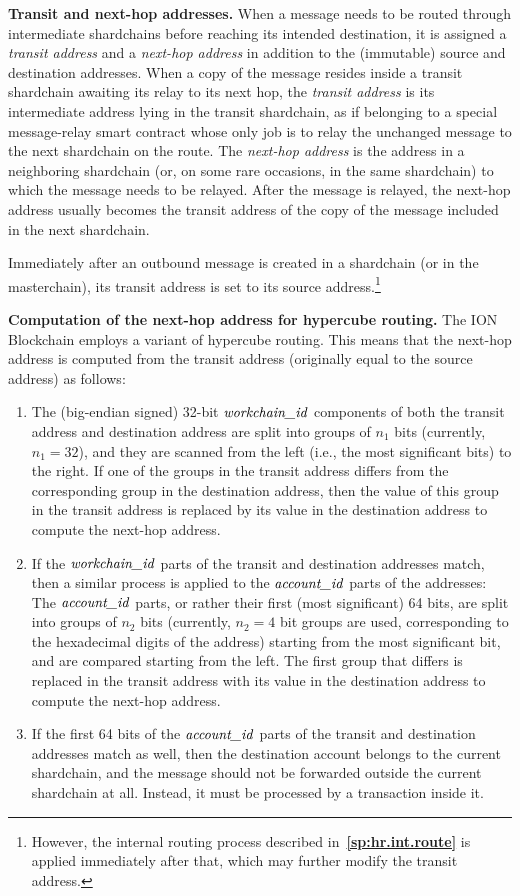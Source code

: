 \documentclass[12pt,oneside]{article}
\def\makepoint#1{\medbreak\noindent{\bf #1.\ }}
\def\nxsubpoint{\refstepcounter{subsubsection}%
  \smallbreak\makepoint{\thesubsubsection}}
\def\refpoint#1{{\rm\textbf{\ref{#1}}}}
\let\ptref=\refpoint
\def\emb#1{\textbf{#1.}}
\let\vr=\textit
\def\workchainid{\vr{workchain\_id\/}}
\def\accountid{\vr{account\_id\/}}
\begin{document}
\nxsubpoint\emb{Transit and next-hop addresses}
When a message needs to be routed through intermediate shardchains before reaching its intended destination, it is assigned a {\em transit address\/} and a {\em next-hop address\/} in addition to the (immutable) source and destination addresses. When a copy of the message resides inside a transit shardchain awaiting its relay to its next hop, the {\em transit address\/} is its intermediate address lying in the transit shardchain, as if belonging to a special message-relay smart contract whose only job is to relay the unchanged message to the next shardchain on the route. The {\em next-hop address\/} is the address in a neighboring shardchain (or, on some rare occasions, in the same shardchain) to which the message needs to be relayed. After the message is relayed, the next-hop address usually becomes the transit address of the copy of the message included in the next shardchain.

Immediately after an outbound message is created in a shardchain (or in the masterchain), its transit address is set to its source address.\footnote{However, the internal routing process described in~\ptref{sp:hr.int.route} is applied immediately after that, which may further modify the transit address.}

\nxsubpoint\label{sp:hr.next.hop}\emb{Computation of the next-hop address for hypercube routing}
The ION Blockchain employs a variant of hypercube routing. This means that the next-hop address is computed from the transit address (originally equal to the source address) as follows:

\begin{enumerate}
\item The (big-endian signed) 32-bit $\workchainid$ components of both the transit address and destination address are split into groups of $n_1$ bits (currently, $n_1=32$), and they are scanned from the left (i.e., the most significant bits) to the right. If one of the groups in the transit address differs from the corresponding group in the destination address, then the value of this group in the transit address is replaced by its value in the destination address to compute the next-hop address.
\item If the $\workchainid$ parts of the transit and destination addresses match, then a similar process is applied to the $\accountid$ parts of the addresses: The $\accountid$ parts, or rather their first (most significant) 64 bits, are split into groups of $n_2$ bits (currently, $n_2=4$ bit groups are used, corresponding to the hexadecimal digits of the address) starting from the most significant bit, and are compared starting from the left. The first group that differs is replaced in the transit address with its value in the destination address to compute the next-hop address.
\item If the first 64 bits of the $\accountid$ parts of the transit and destination addresses match as well, then the destination account belongs to the current shardchain, and the message should not be forwarded outside the current shardchain at all. Instead, it must be processed by a transaction inside it.
\end{enumerate}
\end{document}

